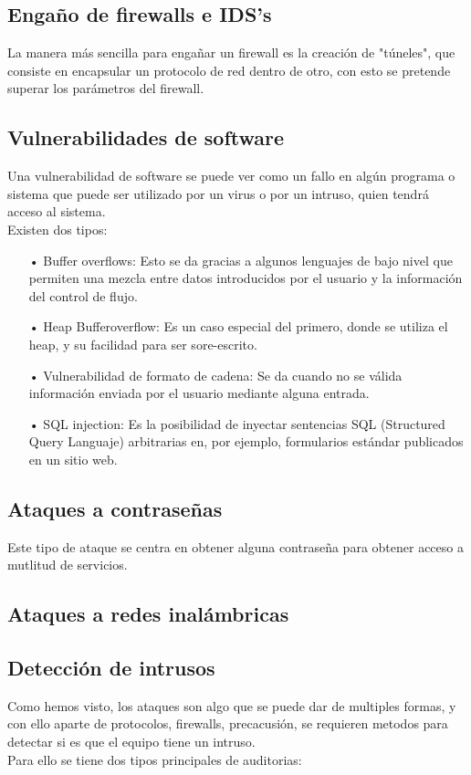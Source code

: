 \documentclass[11pt,a4paper]{article}
\begin{document}
\subsection{Engaño de firewalls e IDS's}
La manera más sencilla para engañar un firewall es la creación de "túneles", que consiste en encapsular un protocolo de red dentro de otro, con esto se pretende superar los parámetros del firewall.
\subsection{Vulnerabilidades de software}
Una vulnerabilidad de software se puede ver como un fallo en algún programa o sistema que puede ser utilizado por un virus o por un intruso, quien tendrá acceso al sistema.
\\Existen dos tipos:
\begin{itemize}
	\item[•] Buffer overflows: Esto se da gracias a algunos lenguajes de bajo nivel que permiten una mezcla entre datos introducidos por el usuario y la información del control de flujo.
	\item[•] Heap Bufferoverflow: Es un caso especial del primero, donde se utiliza el heap, y su facilidad para ser sore-escrito.
	\item[•] Vulnerabilidad de formato de cadena: Se da cuando no se válida información enviada por el usuario mediante alguna entrada.
	\item[•] SQL injection: Es la posibilidad  de  inyectar sentencias SQL (Structured Query Languaje) arbitrarias en, por ejemplo, formularios estándar publicados en un sitio web. 
\end{itemize}

\subsection{Ataques a contraseñas}
Este tipo de ataque se centra en obtener alguna contraseña para obtener acceso a mutlitud de servicios.

\subsection{Ataques a redes inalámbricas}

\subsection{Detección de intrusos}
Como hemos visto, los ataques son algo que se puede dar de multiples formas, y con ello aparte de protocolos, firewalls, precacusión, se requieren metodos para detectar si es que el equipo tiene un intruso.\\
Para ello se tiene dos tipos principales de auditorias:
\end{document}
